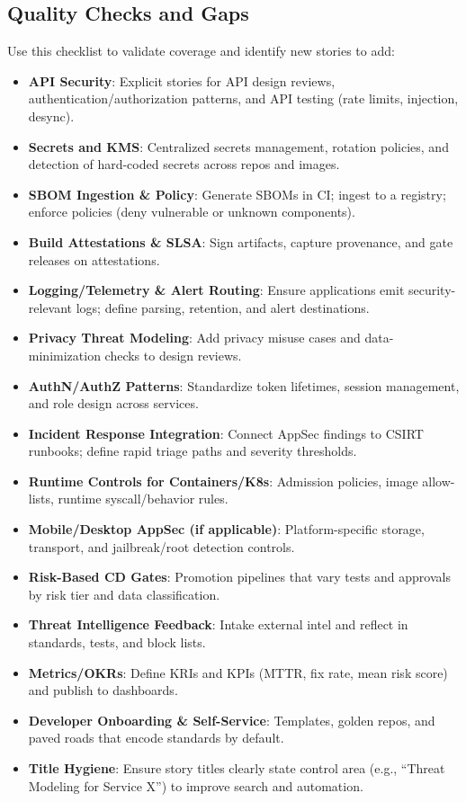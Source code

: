 \documentclass[11pt,a4paper]{article}
\begin{document}
\subsection*{Quality Checks and Gaps}
Use this checklist to validate coverage and identify new stories to add:
\begin{itemize}
  \item \textbf{API Security}: Explicit stories for API design reviews, authentication/authorization patterns, and API testing (rate limits, injection, desync).
  \item \textbf{Secrets and KMS}: Centralized secrets management, rotation policies, and detection of hard-coded secrets across repos and images.
  \item \textbf{SBOM Ingestion \& Policy}: Generate SBOMs in CI; ingest to a registry; enforce policies (deny vulnerable or unknown components).
  \item \textbf{Build Attestations \& SLSA}: Sign artifacts, capture provenance, and gate releases on attestations.
  \item \textbf{Logging/Telemetry \& Alert Routing}: Ensure applications emit security-relevant logs; define parsing, retention, and alert destinations.
  \item \textbf{Privacy Threat Modeling}: Add privacy misuse cases and data-minimization checks to design reviews.
  \item \textbf{AuthN/AuthZ Patterns}: Standardize token lifetimes, session management, and role design across services.
  \item \textbf{Incident Response Integration}: Connect AppSec findings to CSIRT runbooks; define rapid triage paths and severity thresholds.
  \item \textbf{Runtime Controls for Containers/K8s}: Admission policies, image allow-lists, runtime syscall/behavior rules.
  \item \textbf{Mobile/Desktop AppSec (if applicable)}: Platform-specific storage, transport, and jailbreak/root detection controls.
  \item \textbf{Risk-Based CD Gates}: Promotion pipelines that vary tests and approvals by risk tier and data classification.
  \item \textbf{Threat Intelligence Feedback}: Intake external intel and reflect in standards, tests, and block lists.
  \item \textbf{Metrics/OKRs}: Define KRIs and KPIs (MTTR, fix rate, mean risk score) and publish to dashboards.
  \item \textbf{Developer Onboarding \& Self-Service}: Templates, golden repos, and paved roads that encode standards by default.
  \item \textbf{Title Hygiene}: Ensure story titles clearly state control area (e.g., ``Threat Modeling for Service X'') to improve search and automation.
\end{itemize}
\end{document}
